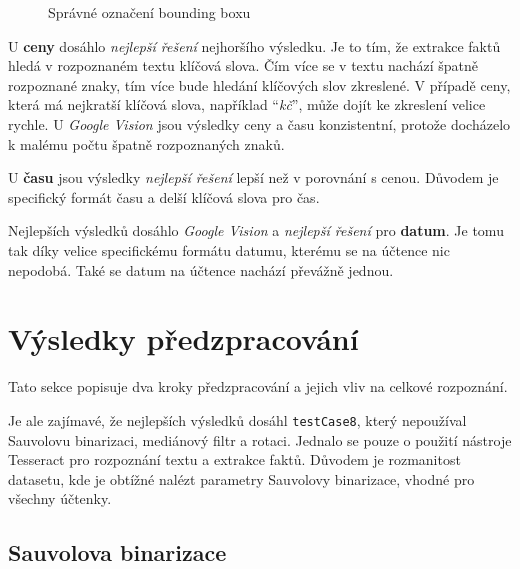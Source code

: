 \documentclass[thesis=B,czech]{FITthesis}[2019/12/23]
\def\myit#1{\texttt{#1}}
\begin{document}
\begin{figure}[hp]
    \centering
    \hspace{1pt}
    \caption{Správné označení bounding boxu}
    \label{fig:bb-hit-rate-comparison}%
\end{figure}

U \textbf{ceny} dosáhlo \textit{nejlepší řešení} nejhoršího výsledku. Je to tím, že extrakce faktů hledá v rozpoznaném textu klíčová slova. Čím více se v textu nachází špatně rozpoznané znaky, tím více bude hledání klíčových slov zkreslené. V případě ceny, která má nejkratší klíčová slova, například \enquote{\textit{kč}}, může dojít ke zkreslení velice rychle. U \textit{Google Vision} jsou výsledky ceny a času konzistentní, protože docházelo k malému počtu špatně rozpoznaných znaků.

U \textbf{času} jsou výsledky \textit{nejlepší řešení} lepší než v porovnání s cenou. Důvodem je specifický formát času a delší klíčová slova pro čas.

Nejlepších výsledků dosáhlo \textit{Google Vision} a \textit{nejlepší řešení} pro \textbf{datum}. Je tomu tak díky velice specifickému formátu datumu, kterému se na účtence nic nepodobá. Také se datum na účtence nachází převážně jednou.


 \section{Výsledky předzpracování}
 \label{sec:preprocessing-results}

 Tato sekce popisuje dva kroky předzpracování a jejich vliv na celkové rozpoznání.

 Je ale zajímavé, že nejlepších výsledků dosáhl \myit{testCase8}, který nepoužíval Sauvolovu binarizaci, mediánový filtr a rotaci. Jednalo se pouze o použití nástroje Tesseract pro rozpoznání textu a extrakce faktů. Důvodem je rozmanitost datasetu, kde je obtížné nalézt parametry Sauvolovy binarizace, vhodné pro všechny účtenky.

 \subsection{Sauvolova binarizace}
 \label{subsec:sauvola-results}
\end{document}
